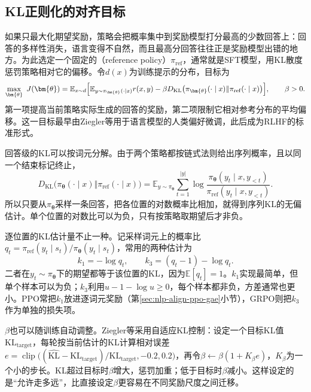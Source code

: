 \subsection{KL正则化的对齐目标}
\label{sec:nlp-align-kl-objective}

如果只最大化期望奖励，策略会把概率集中到奖励模型打分最高的少数回答上：回答的多样性消失，语言变得不自然，而且最高分回答往往正是奖励模型出错的地方。为此选定一个固定的（reference policy）$\pi_{\mathrm{ref}}$，通常就是SFT模型，用KL散度惩罚策略相对它的偏移。令$d(x)$为训练提示的分布，目标为
\begin{equation}
\label{eq:nlp-align-regularized-reward}
 \max_{\bm{\theta}}\ J(\bm{\theta})
 =\mathbb{E}_{x\sim d}\Bigl[
   \mathbb{E}_{y\sim\pi_{\bm{\theta}}(\cdot\mid x)}r(x,y)
   -\beta D_{\mathrm{KL}}\bigl(\pi_{\bm{\theta}}(\cdot\mid x)\Vert\pi_{\mathrm{ref}}(\cdot\mid x)\bigr)\Bigr],\qquad \beta>0.
\end{equation}
第一项提高当前策略实际生成的回答的奖励，第二项限制它相对参考分布的平均偏移。这一目标最早由Ziegler等用于语言模型的人类偏好微调\cite{nlp-align-ziegler2019}，此后成为RLHF的标准形式。

回答级的KL可以按词元分解。由于两个策略都按链式法则给出序列概率，且以同一个结束标记终止，
\[
 D_{\mathrm{KL}}\bigl(\pi_{\bm\theta}(\cdot\mid x)\Vert\pi_{\mathrm{ref}}(\cdot\mid x)\bigr)
 =\mathbb E_{y\sim\pi_{\bm\theta}}\sum_{t=1}^{|y|}\log\frac{\pi_{\bm\theta}(y_t\mid x,y_{<t})}{\pi_{\mathrm{ref}}(y_t\mid x,y_{<t})}.
\]
所以只要从$\pi_{\bm\theta}$采样一条回答，把各位置的对数概率比相加，就得到序列KL的无偏估计。单个位置的对数比可以为负，只有按策略取期望后才非负。

逐位置的KL估计量不止一种。记采样词元上的概率比$q_t=\pi_{\mathrm{ref}}(y_t\mid s_t)/\pi_{\bm\theta}(y_t\mid s_t)$，常用的两种估计为
\[
 k_1=-\log q_t,\qquad k_3=(q_t-1)-\log q_t .
\]
二者在$y_t\sim\pi_{\bm\theta}$下的期望都等于该位置的KL，因为$\mathbb E[q_t]=1$。$k_1$实现最简单，但单个样本可以为负；$k_3$利用$u-1-\log u\ge0$，每个样本都非负，方差通常也更小。PPO常把$k_1$放进逐词元奖励（第\ref{sec:nlp-align-ppo-gae}小节），GRPO则把$k_3$作为单独的损失项。

$\beta$也可以随训练自动调整。Ziegler等采用自适应KL控制：设定一个目标KL值$\mathrm{KL}_{\mathrm{target}}$，每轮按当前估计的KL计算相对误差$e=\operatorname{clip}\bigl((\widehat{\mathrm{KL}}-\mathrm{KL}_{\mathrm{target}})/\mathrm{KL}_{\mathrm{target}},-0.2,0.2\bigr)$，再令$\beta\gets\beta(1+K_\beta e)$，$K_\beta$为一个小的步长。KL超过目标时$\beta$增大，惩罚加重；低于目标时$\beta$减小。这样设定的是“允许走多远”，比直接设定$\beta$更容易在不同奖励尺度之间迁移。

